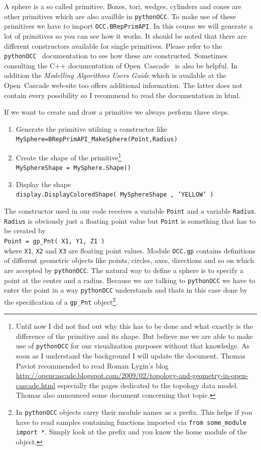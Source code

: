 A sphere is a so called primitive.
Boxes, tori, wedges, cylinders and cones are other primitives which are also availble in {\tt pythonOCC}.
To make use of these primitives we have to import {\tt OCC.BRepPrimAPI}.
In this course we will generate a lot of primitives so you can see how it works.
It should be noted that there are different constructors available for single primitives.
Please refer to the {\tt pythonOCC}~\cite{PYTHON_OCC_DOCU} documentation to see how these are constructed.
Sometimes consulting the C++ documentation of Open~Cascade~\cite{OPENCASCADE_ORG} is also be helpful.
In addition the {\it Modelling Algorithms Users Guide} which is available at the Open~Cascade web-site too offers additional information.
The latter does not contain every possibility so I recommend to read the documentation in html.

If we want to create and draw a primitive we always perform three steps.
\begin{enumerate}
\item Generate the primitive utilzing a constructor like \\ 
		{\tt MySphere=BRepPrimAPI\_MakeSphere(Point,Radius)}
\item Create the shape of the primitive\footnote{Until now I did not find out why this has to be done and what exactly is the difference of the primitive and its shape. But believe me we are able to make use of {\tt pythonOCC} for our visualization purposes without that knowledge. As soon as I understand the background I will update the document. Thomas Paviot recommended to read 
Roman Lygin's blog \href{http://opencascade.blogspot.com/2009/02/topology-and-geometry-in-open-cascade.html}{http://opencascade.blogspot.com/2009/02/topology-and-geometry-in-open-cascade.html} especially the pages dedicated to the topology data model. Thomas also announced some document concerning that topic.
}\\
		{\tt MySphereShape = MySphere.Shape()}
\item Display the shape\\
		{\tt display.DisplayColoredShape( MySphereShape , 'YELLOW' )}
\end{enumerate}

The constructor used in our code receives a variable {\tt Point} and a variable  {\tt Radius}.
{\tt Radius} is obviously just a floating point value but {\tt Point} is something that has to be created by\\
{\tt Point = gp\_Pnt( X1, Y1, Z1 ) }\\
where {\tt X1}, {\tt X2} and {\tt X3} are floating point values.
Module {\tt OCC.gp} contains definitions of different geometric objects like points, circles, axes, directions and so on which are accepted by {\tt pythonOCC}.
The natural way to define a sphere is to specify a point at the center and a radius.
Because we are talking to {\tt pythonOCC} we have to enter the point in a way  {\tt pythonOCC} understands and thats in this case done by the specification of a {\tt gp\_Pnt} object\footnote{In {\tt pythonOCC} objects carry their module names as a prefix. This helps if you have to read samples containing functions imported via {\tt from some\_module import~*}. Simply look at the prefix and you know the home module of the object.}.
%
